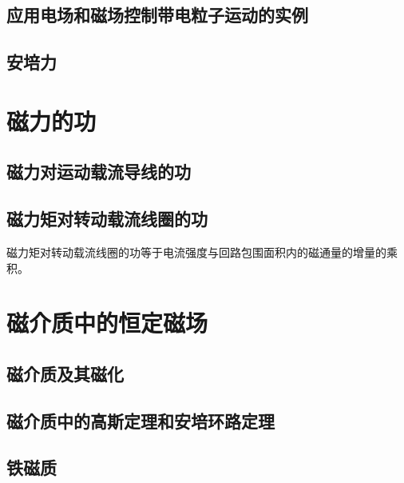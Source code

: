    \subsection{应用电场和磁场控制带电粒子运动的实例}
    \subsection{安培力}

\section{磁力的功}
    \subsection{磁力对运动载流导线的功}
    \subsection{磁力矩对转动载流线圈的功}
    磁力矩对转动载流线圈的功等于电流强度与回路包围面积内的磁通量的增量的乘积。

\section{磁介质中的恒定磁场}
    \subsection{磁介质及其磁化}
    \subsection{磁介质中的高斯定理和安培环路定理}
    \subsection{铁磁质}

\endinput